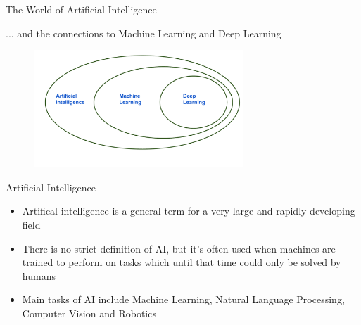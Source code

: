 \documentclass[11pt,compress,t,notes=noshow, xcolor=table]{beamer}
\begin{document}

\begin{frame}{The World of Artificial Intelligence}

... and the connections to Machine Learning and Deep Learning


\begin{center}

  \begin{figure}
    \includegraphics[width=0.7\textwidth]{figure_man/learning}
  \end{figure}

  \fontsize{13pt}{13pt}\selectfont
  

%  
  
  \end{center}
  
\end{frame}


\begin{frame}{Artificial Intelligence}

\begin{itemize}
	\item Artifical intelligence is a general term for a very large and rapidly developing field
	\item There is no strict definition of AI, but it's often used when machines are trained to perform on tasks which until that time could only be solved by humans
	\item Main tasks of AI include Machine Learning, Natural Language Processing, Computer Vision and Robotics
\end{itemize}
  
\end{frame}
\end{document}
